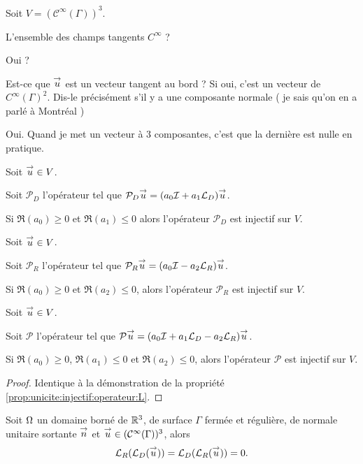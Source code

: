   Soit \(V=(\mathcal{C}^\infty(\Gamma))^3\).
  \begin{REM}
    L'ensemble des champs tangents \(C^\infty\) ?
  \end{REM}
  \begin{REP}
    Oui ?
  \end{REP}
  \begin{REM}
    Est-ce que \({\overset{\rightarrow}{u}}\) est un vecteur tangent au bord ?
    Si oui, c'est un vecteur de \(C^\infty(\Gamma)^2\).
    Dis-le précisément s'il y a une composante normale ( je sais qu'on en a parlé à Montréal )
  \end{REM}
  \begin{REP}
    Oui.
    Quand je met un vecteur à 3 composantes, c'est que la dernière est nulle en pratique.
  \end{REP}
  \begin{prop}
    \label{prop:unicite:injectif:operateur:LD}
    Soit \({\overset{\rightarrow}{u}} \in V\).

    Soit \(\mathcal{P}_D\) l'opérateur tel que \(\mathcal{P}_D{\overset{\rightarrow}{u}} = (a_0{\mathcal{I}} + a_1 {\mathcal{L}_D}){\overset{\rightarrow}{u}}\).

    Si \(\Re(a_0)\ge 0\) et \(\Re(a_1)\le 0\) alors l'opérateur \(\mathcal{P}_D\) est injectif sur \(V\).
  \end{prop}
  \begin{prop}
    \label{prop:unicite:injectif:operateur:LR}
    Soit \({\overset{\rightarrow}{u}} \in V\).

    Soit \(\mathcal{P}_R\) l'opérateur tel que \(\mathcal{P}_R{\overset{\rightarrow}{u}} = (a_0{\mathcal{I}} - a_2 {\mathcal{L}_R}){\overset{\rightarrow}{u}}\).

    Si \(\Re(a_0)\ge 0\) et \(\Re(a_2)\le 0\), alors l'opérateur \(\mathcal{P}_R\) est injectif sur \(V\).
  \end{prop}
  \begin{prop}
    \label{prop:unicite:injectif:operateur:LD-LR}
    Soit \({\overset{\rightarrow}{u}} \in V\).
    
    Soit \(\mathcal{P}\) l'opérateur tel que \(\mathcal{P}{\overset{\rightarrow}{u}} = (a_0{\mathcal{I}} + a_1 {\mathcal{L}_D} - a_2{\mathcal{L}_R}){\overset{\rightarrow}{u}}\).

    Si \(\Re(a_0)\ge 0\), \(\Re(a_1)\le 0\) et \(\Re(a_2)\le 0\), alors l'opérateur \(\mathcal{P}\) est injectif sur \(V\).
  \end{prop}
  \begin{proof}
   Identique à la démonstration de la propriété \ref{prop:unicite:injectif:operateur:L}.
  \end{proof}

  \begin{prop}
    Soit \(\Omega\) un domaine borné de \(\mathbb R^3\), de surface \(\Gamma\) fermée et régulière, de normale unitaire sortante \({\overset{\rightarrow}{n}}\) et \({\overset{\rightarrow}{u}} \in (\mathcal{C}^\infty(\Gamma))^3\), alors
    \begin{equation*}
        {\mathcal{L}_R}({\mathcal{L}_D}({\overset{\rightarrow}{u}})) = {\mathcal{L}_D}({\mathcal{L}_R}({\overset{\rightarrow}{u}})) = 0.
    \end{equation*}
  \end{prop}

